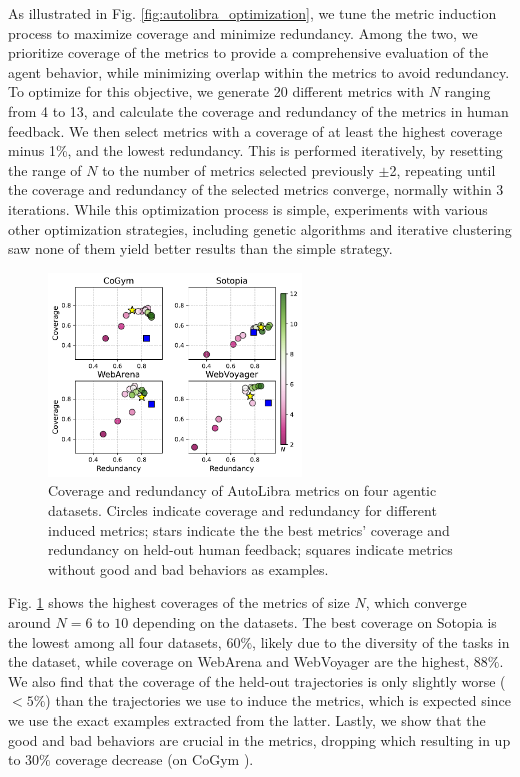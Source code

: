 As illustrated in Fig. \ref{fig:autolibra_optimization}, we tune the metric induction process to maximize coverage and minimize redundancy.
Among the two, we prioritize coverage of the metrics to provide a comprehensive evaluation of the agent behavior,
while minimizing overlap within the metrics to avoid redundancy.
To optimize for this objective, we generate 20 different metrics with $N$ ranging from 4 to 13,
and calculate the coverage and redundancy of the metrics in human feedback.
We then select metrics with a coverage of at least the highest coverage minus 1\%,
and the lowest redundancy.
This is performed iteratively, by resetting the range of $N$ to the number of metrics selected
previously $\pm$2, repeating until the coverage and redundancy
of the selected metrics converge, normally within 3 iterations.
While this optimization process is simple, experiments with various other optimization
strategies, including genetic algorithms and iterative clustering saw none of them
yield better results than the simple strategy.
\begin{figure}

    \includegraphics[width=0.6\textwidth]{figs/four_datasets_grid.pdf}
    \vspace{-15pt}  
    \caption{Coverage and redundancy of AutoLibra metrics on four agentic datasets. Circles indicate coverage
    and redundancy for different induced metrics; stars indicate the the best metrics' coverage and redundancy on held-out human feedback; squares indicate metrics without good and bad behaviors as examples.}
    \label{fig:coverage-redundancy}
\end{figure}
Fig. \ref{fig:coverage-redundancy} shows the highest coverages of the metrics of size $N$, which converge around $N=6$ to $10$ depending on the datasets. The best coverage on Sotopia \citep{zhousotopia} is the lowest among all four datasets, $60\%$, likely due to the diversity of the tasks in the dataset, while coverage on WebArena \citep{zhouwebarena} and WebVoyager \citep{he2024webvoyager} are the highest, $88\%$. We also find that the coverage of the held-out trajectories is only slightly worse ($<5\%$) than the trajectories we use to induce the metrics, which is expected since we use the exact examples extracted from the latter. Lastly, we show that the good and bad behaviors are crucial in the metrics, dropping which resulting in up to $30\%$ coverage decrease (on CoGym \citep{shao2024collaborative}).



